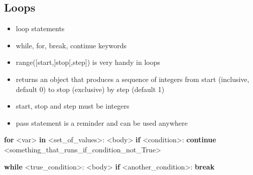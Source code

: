 \documentclass[11pt]{article}
\providecommand{\tightlist}{%
      \setlength{\itemsep}{0pt}\setlength{\parskip}{0pt}}
\newenvironment{Shaded}{}{}
\newcommand{\KeywordTok}[1]{\textcolor[rgb]{0.00,0.44,0.13}{\textbf{{#1}}}}
\newcommand{\NormalTok}[1]{{#1}}
\newcommand{\ControlFlowTok}[1]{\textcolor[rgb]{0.00,0.44,0.13}{\textbf{{#1}}}}
\newcommand{\OperatorTok}[1]{\textcolor[rgb]{0.40,0.40,0.40}{{#1}}}
\begin{document}
    \hypertarget{loops}{%
\subsection{Loops}\label{loops}}

\begin{itemize}
\tightlist
\item
  loop statements
\item
  while, for, break, continue keywords
\item
  range({[}start,{]}stop{[},step{]}) is very handy in loops
\item
  returns an object that produces a sequence of integers from start
  (inclusive, default 0) to stop (exclusive) by step (default 1)
\item
  start, stop and step must be integers
\item
  pass statement is a reminder and can be used anywhere
\end{itemize}

\begin{Shaded}
\begin{Highlighting}[]
\ControlFlowTok{for} \OperatorTok{\textless{}}\NormalTok{var}\OperatorTok{\textgreater{}} \KeywordTok{in} \OperatorTok{\textless{}}\NormalTok{set\_of\_values}\OperatorTok{\textgreater{}}\NormalTok{: }
    \OperatorTok{\textless{}}\NormalTok{body}\OperatorTok{\textgreater{}}
    \ControlFlowTok{if} \OperatorTok{\textless{}}\NormalTok{condition}\OperatorTok{\textgreater{}}\NormalTok{:}
        \ControlFlowTok{continue}
    \OperatorTok{\textless{}}\NormalTok{something\_that\_runs\_if\_condition\_not\_True}\OperatorTok{\textgreater{}}        
\end{Highlighting}
\end{Shaded}

\begin{Shaded}
\begin{Highlighting}[]
\ControlFlowTok{while} \OperatorTok{\textless{}}\NormalTok{true\_condition}\OperatorTok{\textgreater{}}\NormalTok{:}
    \OperatorTok{\textless{}}\NormalTok{body}\OperatorTok{\textgreater{}}
    \ControlFlowTok{if} \OperatorTok{\textless{}}\NormalTok{another\_condition}\OperatorTok{\textgreater{}}\NormalTok{:}
        \ControlFlowTok{break}    
\end{Highlighting}
\end{Shaded}
\end{document}
